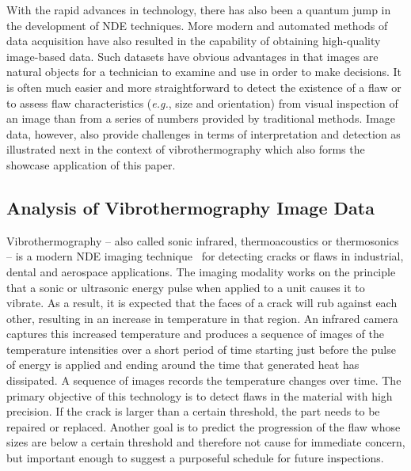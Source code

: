 \documentclass[12pt]{article}
\begin{document}
With the rapid advances in technology, there has also been a quantum
jump in the development of NDE techniques. More modern
and automated methods of data acquisition have also resulted in the
capability of obtaining high-quality  
image-based data. Such datasets have obvious advantages in
that images are  natural objects for a technician to examine and use
in order to make decisions. It is often much  easier and more
straightforward to detect the existence of a flaw or to assess flaw
characteristics ({\em e.g.}, size and orientation) from visual
inspection of an image than from a series of numbers provided by
traditional methods. Image data, however, also provide challenges in 
terms of interpretation and detection as illustrated next in the
context of vibrothermography which also forms the showcase
application of this paper.

\subsection{Analysis of Vibrothermography Image Data}
\label{vbexample}
Vibrothermography -- also called sonic infrared, thermoacoustics or
thermosonics -- is a modern NDE imaging
technique~\citep{maldague01,hennekeandjones79,reifsnideretal80,holland07}   
for detecting cracks or flaws in industrial, dental and aerospace 
applications. The imaging modality works on the principle that a sonic
or ultrasonic energy pulse when applied to a unit  causes
it to vibrate. As a result, it is expected that the faces of a crack will
rub against each other, resulting in an increase in temperature in
that region. An infrared camera captures this increased temperature and 
produces a sequence of images of the temperature intensities over a short period
of time starting just before the pulse of energy is applied and ending around
the time that generated heat has dissipated. A sequence of images
records the temperature changes over time. The primary objective of 
this technology is to detect flaws in the material with high
precision. If the crack is larger than a certain threshold,
the part needs to be %
repaired or replaced. 
Another goal is to predict the progression of the flaw whose sizes
are below a certain threshold and therefore not cause for immediate
concern, but important enough to suggest a purposeful schedule for
future inspections. 
\end{document}
